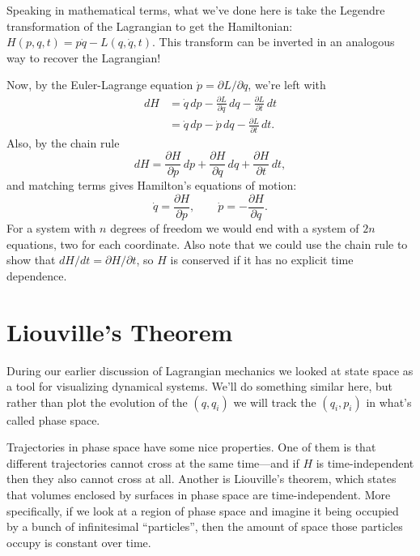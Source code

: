 \documentclass[../p111main.tex]{subfiles}
\begin{document}
Speaking in mathematical terms, what we've done here is take the Legendre transformation of the Lagrangian to get the Hamiltonian: $H(p, q, t) = p \dot q - L(q, \dot q, t)$.
This transform can be inverted in an analogous way to recover the Lagrangian!

Now, by the Euler-Lagrange equation $\dot p = \partial L / \partial q$, we're left with
\begin{align*}
    dH &= \dot q \,dp - \frac{\partial L}{\partial q} \,dq - \frac{\partial L}{\partial t} \,dt \\
    &= \dot q \,dp - \dot p \,dq - \frac{\partial L}{\partial t} \,dt.
\end{align*}
Also, by the chain rule
\[ dH = \frac{\partial H}{\partial p} \,dp + \frac{\partial H}{\partial q} \,dq + \frac{\partial H}{\partial t} \,dt, \]
and matching terms gives Hamilton's equations of motion:
\[ \dot q = \frac{\partial H}{\partial p}, \qquad \dot p = -\frac{\partial H}{\partial q}. \]
For a system with $n$ degrees of freedom we would end with a system of $2n$ equations, two for each coordinate.
Also note that we could use the chain rule to show that $dH / dt = \partial H / \partial t$, so $H$ is conserved if it has no explicit time dependence.

\section{Liouville's Theorem}
During our earlier discussion of Lagrangian mechanics we looked at state space as a tool for visualizing dynamical systems.
We'll do something similar here, but rather than plot the evolution of the $(q, q_i)$ we will track the $(q_i, p_i)$ in what's called phase space.

Trajectories in phase space have some nice properties.
One of them is that different trajectories cannot cross at the same time---and if $H$ is time-independent then they also cannot cross at all.
Another is Liouville's theorem, which states that volumes enclosed by surfaces in phase space are time-independent.
More specifically, if we look at a region of phase space and imagine it being occupied by a bunch of infinitesimal ``particles'', then the amount of space those particles occupy is constant over time.
\end{document}
